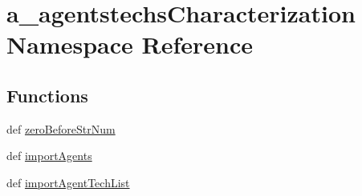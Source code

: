 \hypertarget{namespacea__agentstechs_characterization}{\section{a\-\_\-agentstechs\-Characterization Namespace Reference}
\label{namespacea__agentstechs_characterization}
}
\subsection*{Functions}
\begin{DoxyCompactItemize}
\item 
def \hyperlink{namespacea__agentstechs_characterization_aab1a93fa7dfbce4f7a3073c55e2dc842}{zero\-Before\-Str\-Num}
\item 
def \hyperlink{namespacea__agentstechs_characterization_a921a22f00acd46ee23da983ac540670b}{import\-Agents}
\item 
def \hyperlink{namespacea__agentstechs_characterization_af28c4f175951326a2cb8b7f36dfb7ef7}{import\-Agent\-Tech\-List}
\end{DoxyCompactItemize}
